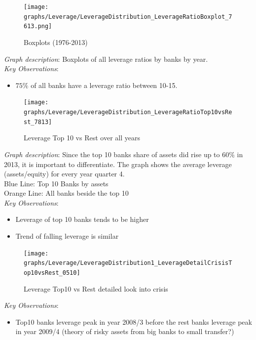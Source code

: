 \documentclass[12pt, a4paper]{article} %
\begin{document}
\newpage

\begin{figure}[hbtp]
\centering
\caption{Boxplots (1976-2013)}
\texttt{[image: graphs/Leverage/LeverageDistribution\_LeverageRatioBoxplot\_7613.png]}
\end{figure}

\noindent \textit{Graph description}: Boxplots of all leverage ratios by banks by year. 
\\

\noindent \textit{Key Observations}:
\begin{itemize}
\item $75\%$ of all banks have a leverage ratio between 10-15.
\end{itemize}




\begin{figure}[hbtp]
\centering
\caption{Leverage Top 10 vs Rest over all years}
\texttt{[image: graphs/Leverage/LeverageDistribution\_LeverageRatioTop10vsRest\_7813]}
\end{figure}



\newpage

\noindent \textit{Graph description}: Since the top 10 banks share of assets did rise up to 60\% in 2013, it is important to differentiate. The graph shows the average leverage (assets/equity) for every year quarter 4.\\ Blue Line: Top 10 Banks by assets\\
Orange Line: All banks beside the top 10\\

\noindent \textit{Key Observations}:
\begin{itemize}
\item Leverage of top 10 banks tends to be higher
\item Trend of falling leverage is similar
\end{itemize}




\begin{figure}[hbtp]
\centering
\caption{Leverage Top10 vs Rest detailed look into crisis}
\texttt{[image: graphs/Leverage/LeverageDistribution1\_LeverageDetailCrisisTop10vsRest\_0510]}
\end{figure}


\noindent \textit{Key Observations}:
\begin{itemize}
\item Top10 banks leverage peak in year 2008/3 before the rest banks leverage peak in year 2009/4 (theory of risky assets from big banks to small transfer?) 
\end{itemize}
\end{document}
